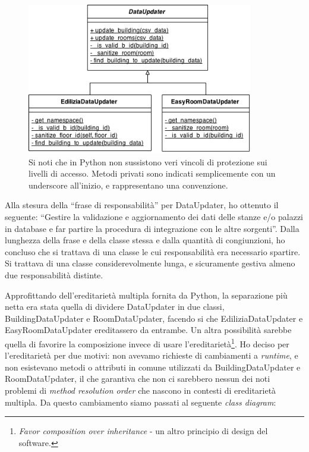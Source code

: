 \documentclass[12pt]{report}
\begin{document}
\begin{figure}[H]
    \centering
    \includegraphics[width=280pt,natwidth=442,natheight=296]{class_diagram_dataupdater_before.png}
    \caption{Si noti che in Python non sussistono veri vincoli di protezione
    sui livelli di accesso. Metodi privati sono indicati semplicemente con
    un underscore all'inizio, e rappresentano una convenzione.}
    \label{fig:class_diagram_dataupdater_before}
\end{figure}

Alla stesura della ``frase di responsabilità'' per DataUpdater, ho
ottenuto il seguente: 
``Gestire la validazione e aggiornamento dei dati delle stanze 
e/o palazzi in database e far partire la procedura di integrazione
con le altre sorgenti''. 
Dalla lunghezza della frase e della classe stessa e dalla quantità di 
congiunzioni, ho concluso che si trattava di una classe le cui responsabilità
era necessario spartire. Si trattava di una classe considerevolmente lunga, 
e sicuramente gestiva almeno due responsabilità distinte.

Approfittando dell'ereditarietà multipla fornita da Python, la separazione più netta
era stata quella di dividere DataUpdater in due classi, 
BuildingDataUpdater e RoomDataUpdater, facendo si che EdiliziaDataUpdater 
e EasyRoomDataUpdater ereditassero da entrambe. Un altra possibilità 
sarebbe quella di favorire la composizione invece di usare l'ereditarietà\footnote{
\textit{Favor composition over inheritance} - un altro principio di
design del software.
}. 
Ho deciso per l'ereditarietà per due motivi: non avevamo richieste di 
cambiamenti a \textit{runtime}, e non esistevano metodi o attributi 
in comune utilizzati da BuildingDataUpdater e RoomDataUpdater, il che garantiva 
che non ci sarebbero nessun dei noti problemi di \textit{method resolution 
order} che nascono in contesti di ereditarietà multipla. Da questo cambiamento
siamo passati al seguente \textit{class diagram}:
\end{document}
